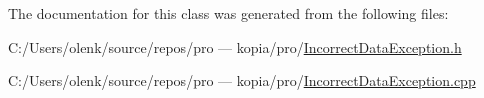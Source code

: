 The documentation for this class was generated from the following files\+:\begin{DoxyCompactItemize}
\item 
C\+:/\+Users/olenk/source/repos/pro — kopia/pro/\mbox{\hyperlink{_incorrect_data_exception_8h}{Incorrect\+Data\+Exception.\+h}}\item 
C\+:/\+Users/olenk/source/repos/pro — kopia/pro/\mbox{\hyperlink{_incorrect_data_exception_8cpp}{Incorrect\+Data\+Exception.\+cpp}}\end{DoxyCompactItemize}
